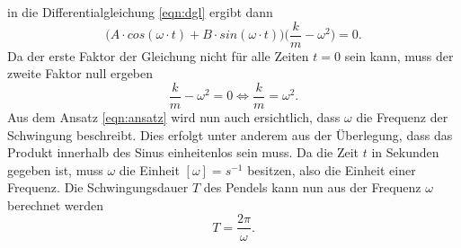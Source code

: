in die Differentialgleichung \eqref{eqn:dgl} ergibt dann
\begin{equation}
    \biggl(A\cdot cos(\omega\cdot t)+B\cdot sin(\omega\cdot t)\biggr)\biggl(\frac{k}{m}-\omega^2\biggr)=0.
\end{equation}
Da der erste Faktor der Gleichung nicht für alle Zeiten $t=0$ sein kann, muss der zweite Faktor null ergeben
\begin{equation}
    \frac{k}{m}-\omega^2=0 \Leftrightarrow \frac{k}{m}=\omega^2 .
\end{equation}
Aus dem Ansatz \eqref{eqn:ansatz} wird nun auch ersichtlich, dass $\omega$ die Frequenz der Schwingung beschreibt. Dies erfolgt
unter anderem aus der Überlegung, dass das Produkt innerhalb des Sinus einheitenlos sein muss. Da die Zeit $t$ in Sekunden gegeben
ist, muss $\omega$ die Einheit $[\omega]=s^{-1}$ besitzen, also die Einheit einer Frequenz.
Die Schwingungsdauer $T$ des Pendels kann nun aus der Frequenz $\omega$ berechnet werden
\begin{equation}
  \label{eqn:omega}
    T=\frac{2\pi}{\omega}.
\end{equation}

